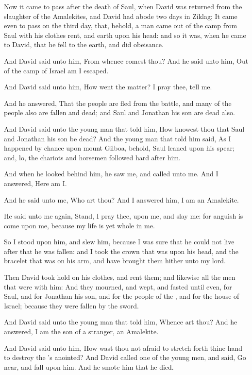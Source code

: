 \Chapter
\Verse Now it came to pass after the death of Saul, when David was returned from the slaughter of the Amalekites, and David had abode two days in Ziklag; \Verse It came even to pass on the third day, that, behold, a man came out of the camp from Saul with his clothes rent, and earth upon his head: and so it was, when he came to David, that he fell to the earth, and did obeisance.

\Verse And David said unto him, From whence comest thou? And he said unto him, Out of the camp of Israel am I escaped.

\Verse And David said unto him, How went the matter? I pray thee, tell me.

And he answered, That the people are fled from the battle, and many of the people also are fallen and dead; and Saul and Jonathan his son are dead also.

\Verse And David said unto the young man that told him, How knowest thou that Saul and Jonathan his son be dead?  \Verse And the young man that told him said, As I happened by chance upon mount Gilboa, behold, Saul leaned upon his spear; and, lo, the chariots and horsemen followed hard after him.

\Verse And when he looked behind him, he saw me, and called unto me. And I answered, Here am I.

\Verse And he said unto me, Who art thou? And I answered him, I am an Amalekite.

\Verse He said unto me again, Stand, I pray thee, upon me, and slay me: for anguish is come upon me, because my life is yet whole in me.

\Verse So I stood upon him, and slew him, because I was sure that he could not live after that he was fallen: and I took the crown that was upon his head, and the bracelet that was on his arm, and have brought them hither unto my lord.

\Verse Then David took hold on his clothes, and rent them; and likewise all the men that were with him: \Verse And they mourned, and wept, and fasted until even, for Saul, and for Jonathan his son, and for the people of the \LORD, and for the house of Israel; because they were fallen by the sword.

\Verse And David said unto the young man that told him, Whence art thou?  And he answered, I am the son of a stranger, an Amalekite.

\Verse And David said unto him, How wast thou not afraid to stretch forth thine hand to destroy the \LORD's anointed?  \Verse And David called one of the young men, and said, Go near, and fall upon him. And he smote him that he died.

